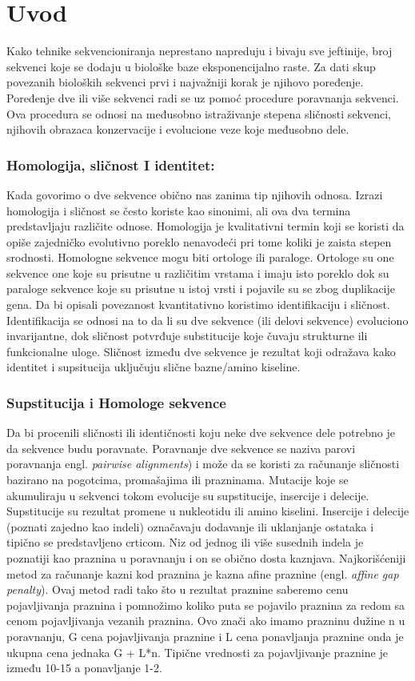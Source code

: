 \chapter{Uvod}

Kako tehnike sekvencioniranja neprestano napreduju i bivaju sve jeftinije, broj sekvenci koje se dodaju u biološke baze eksponencijalno raste.  Za dati skup povezanih bioloških sekvenci prvi i najvažniji korak je njihovo poređenje. Poređenje dve ili više sekvenci radi se uz pomoć procedure poravnanja sekvenci. Ova procedura se odnosi na međusobno istraživanje stepena sličnosti sekvenci, njihovih obrazaca konzervacije i evolucione veze koje međusobno dele.

\subsection{Homologija, sličnost I identitet:}
Kada govorimo o dve sekvence obično nas zanima tip njihovih odnosa. Izrazi homologija i sličnost se često koriste kao sinonimi, ali ova dva termina predstavljaju različite odnose. Homologija je kvalitativni termin koji se koristi da opiše zajedničko evolutivno poreklo nenavodeći pri tome koliki je zaista stepen srodnosti. Homologne sekvence mogu biti ortologe ili paraloge. Ortologe su one sekvence one koje su prisutne u različitim vrstama i imaju isto poreklo dok su paraloge sekvence koje su prisutne u istoj vrsti i pojavile su se zbog duplikacije gena. Da bi opisali povezanost kvantitativno koristimo identifikaciju i sličnost. Identifikacija se odnosi na to da li su dve sekvence (ili delovi sekvence) evoluciono invarijantne, dok sličnost potvrđuje substitucije koje čuvaju strukturne ili funkcionalne uloge. Sličnost između dve sekvence je rezultat koji odražava kako identitet i supsitucija uključuju slične bazne/amino kiseline.


\subsection{Supstitucija i Homologe sekvence}
Da bi procenili sličnosti ili identičnosti koju neke dve sekvence dele potrebno je da sekvence budu poravnate. Poravnanje dve sekvence se naziva parovi poravnanja engl. \textit{pairwise alignments}) i može da se koristi za računanje sličnosti bazirano na pogotcima, promašajima ili prazninama. Mutacije koje se akumuliraju u sekvenci tokom evolucije su supstitucije, insercije i delecije. Supstitucije su rezultat promene u nukleotidu ili amino kiselini. Insercije i delecije (poznati zajedno kao indeli) označavaju dodavanje ili uklanjanje ostataka i tipično se predstavljeno crticom. Niz od jednog ili više susednih indela je poznatiji kao praznina u poravnanju i on se obično dosta kaznjava. Najkorišćeniji metod za računanje kazni kod praznina je kazna afine praznine (engl. \textit{affine gap penalty}).  Ovaj metod radi tako što u rezultat praznine saberemo cenu pojavljivanja praznina i pomnožimo koliko puta se pojavilo praznina za redom sa cenom pojavljivanja vezanih praznina. Ovo znači ako imamo prazninu dužine n u poravnanju, G cena pojavljivanja praznine i L cena ponavljanja praznine onda je ukupna cena jednaka G + L*n. Tipične vrednosti za pojavljivanje praznine je između 10-15 a ponavljanje 1-2. 

